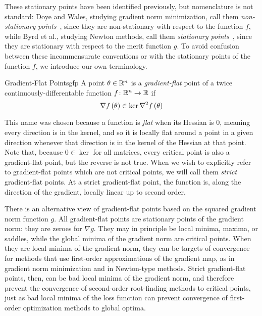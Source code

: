 \documentclass[../../thesis.tex]{subfiles}
\begin{document}
These stationary points have been identified previously,
but nomenclature is not standard:
Doye and Wales, studying gradient norm minimization,
call them \emph{non-stationary points}~\cite{doye2002},
since they are non-stationary with respect to the function $f$,
while Byrd et al., studying Newton methods,
call them \emph{stationary points}~\cite{byrd2004},
since they are stationary with respect to the merit function $g$.
To avoid confusion between these incommensurate conventions
or with the stationary points of the function $f$,
we introduce our own terminology.

\begin{definition}{Gradient-Flat Points}{gfp}
	A point $\theta\in\mathbb{R}^n$ is a \emph{gradient-flat} point
	of a twice continuously-differentable function
	$f\colon\mathbb{R}^n\to\mathbb{R}$ if
	\begin{equation}
		\nabla f\left(\theta\right) \in \ker \nabla^2f\left(\theta\right)
	\end{equation}
\end{definition}

This name was chosen because a function is \emph{flat}
when its Hessian is 0, meaning every direction is in the kernel,
and so it is locally flat around a point in a given direction
whenever that direction is in the kernel of the Hessian at that point.
Note that, because $0 \in \ker$ for all matrices,
every critical point is also a gradient-flat point,
but the reverse is not true.
When we wish to explicitly refer to gradient-flat points
which are not critical points,
we will call them \emph{strict} gradient-flat points.
At a strict gradient-flat point, the function is,
along the direction of the gradient,
locally linear up to second order.

There is an alternative view of gradient-flat points
based on the squared gradient norm function $g$.
All gradient-flat points are stationary points
of the gradient norm:
they are zeroes for $\nabla g$.
They may in principle be local minima, maxima, or saddles,
while the global minima of the gradient norm are critical points.
When they are local minima of the gradient norm,
they can be targets of convergence
for methods that use
first-order approximations of the gradient map,
as in gradient norm minimization and in Newton-type methods.
Strict gradient-flat points, then,
can be bad local minima of the gradient norm,
and therefore prevent the convergence of
second-order root-finding methods
to critical points,
just as bad local minima of the loss function
can prevent convergence of first-order optimization methods
to global optima.
\end{document}
